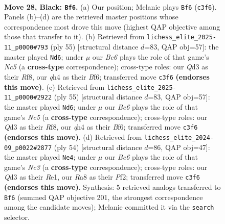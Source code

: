 \documentclass[11pt]{article}
\begin{document}
\clearpage

\begin{figure}[p]\centering
\begin{subfigure}{0.46\textwidth}\centering
\resizebox{\linewidth}{!}{%
\newchessgame
\chessboard[
  setfen={r1b5/ppp2ppk/3n3p/3P4/B6Q/2bq1P1P/PP4P1/R1B3K1 b - - 3 28},
  showmover=false,
  pgfstyle=straightmove, color=movearrow, markmove={c3-f6}
]}
\caption{}
\end{subfigure}\hfill
\begin{subfigure}{0.46\textwidth}\centering
\resizebox{\linewidth}{!}{%
\newchessgame
\chessboard[
  setfen={5rk1/p1p2pp1/1p3b1B/1B1p3P/2nP4/2P3Q1/q4PP1/4R1K1 b - - 0 28},
  showmover=false,
  pgfstyle=straightmove, color=movearrow, markmove={c4-d6}
]}
\caption{}
\end{subfigure}
\\[4pt]
\begin{subfigure}{0.46\textwidth}\centering
\resizebox{\linewidth}{!}{%
\newchessgame
\chessboard[
  setfen={5rk1/p1p2pp1/1p3b1B/1B1p3P/2nP4/2P3Q1/q4PP1/4R1K1 b - - 0 28},
  showmover=false,
  pgfstyle=straightmove, color=movearrow, markmove={c4-d6}
]}
\caption{}
\end{subfigure}\hfill
\begin{subfigure}{0.46\textwidth}\centering
\resizebox{\linewidth}{!}{%
\newchessgame
\chessboard[
  setfen={2r2k1r/1p3ppp/2b4q/p3BB2/3p2P1/P1N2Q2/1P3P1P/4R1K1 w - - 0 28},
  showmover=false,
  pgfstyle=straightmove, color=movearrow, markmove={c3-e4}
]}
\caption{}
\end{subfigure}
\caption{\textbf{Move 28, Black: \texttt{Bf6}.} (a) Our position; Melanie plays \texttt{Bf6} (\texttt{c3f6}). Panels (b)--(d) are the retrieved master positions whose correspondence most drove this move (highest QAP objective among those that transfer to it). (b) Retrieved from \texttt{lichess\_elite\_2025-11\_p0000\#793} (ply 55) [structural distance $d$=83, QAP obj=57]: the master played \texttt{Nd6}; under $\mu$ our \emph{Bc6} plays the role of that game's \emph{Nc5} (a \textbf{cross-type} correspondence); cross-type roles: our \emph{Q}d3 as their \emph{R}f8, our \emph{q}h4 as their \emph{B}f6; transferred move \texttt{c3f6} \textbf{(endorses this move)}. (c) Retrieved from \texttt{lichess\_elite\_2025-11\_p0000\#2922} (ply 55) [structural distance $d$=83, QAP obj=57]: the master played \texttt{Nd6}; under $\mu$ our \emph{Bc6} plays the role of that game's \emph{Nc5} (a \textbf{cross-type} correspondence); cross-type roles: our \emph{Q}d3 as their \emph{R}f8, our \emph{q}h4 as their \emph{B}f6; transferred move \texttt{c3f6} \textbf{(endorses this move)}. (d) Retrieved from \texttt{lichess\_elite\_2024-09\_p0022\#2877} (ply 54) [structural distance $d$=86, QAP obj=47]: the master played \texttt{Ne4}; under $\mu$ our \emph{Bc6} plays the role of that game's \emph{Nc3} (a \textbf{cross-type} correspondence); cross-type roles: our \emph{Q}d3 as their \emph{R}e1, our \emph{R}a8 as their \emph{P}f2; transferred move \texttt{c3f6} \textbf{(endorses this move)}. Synthesis: 5 retrieved analogs transferred to \texttt{Bf6} (summed QAP objective 201, the strongest correspondence among the candidate moves); Melanie committed it via the \texttt{search} selector.}

\end{figure}
\end{document}
